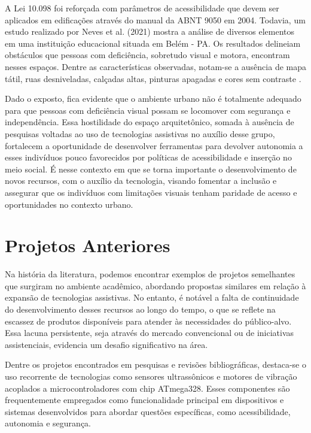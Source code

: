 A Lei 10.098 foi reforçada com parâmetros de acessibilidade que devem ser aplicados em edificações através do manual da ABNT 9050 em 2004. Todavia, um estudo realizado por Neves et al. (2021) mostra a análise de diversos elementos em uma instituição educacional situada em Belém - PA. Os resultados delineiam obstáculos que pessoas com deficiência, sobretudo visual e motora, encontram nesses espaços. Dentre as características observadas, notam-se a ausência de mapa tátil, ruas desniveladas, calçadas altas, pinturas apagadas e cores sem contraste \cite{BarreirasArquitetonicas}.  

Dado o exposto, fica evidente que o ambiente urbano não é totalmente adequado para que pessoas com deficiência visual possam se locomover com segurança e independência. Essa hostilidade do espaço arquitetônico, somada à ausência de pesquisas voltadas ao uso de tecnologias assistivas no auxílio desse grupo, fortalecem a oportunidade de desenvolver ferramentas para devolver autonomia a esses indivíduos pouco favorecidos por políticas de acessibilidade e inserção no meio social. É nesse contexto em que se torna importante o desenvolvimento de novos recursos, com o auxílio da tecnologia, visando fomentar a inclusão e assegurar que os indivíduos com limitações visuais tenham paridade de acesso e oportunidades no contexto urbano.

\section{Projetos Anteriores}
Na história da literatura, podemos encontrar exemplos de projetos semelhantes que surgiram no ambiente acadêmico, abordando propostas similares em relação à expansão de tecnologias assistivas. No entanto, é notável a falta de continuidade do desenvolvimento desses recursos ao longo do tempo, o que se reflete na escassez de produtos disponíveis para atender às necessidades do público-alvo. Essa lacuna persistente, seja através do mercado convencional ou de iniciativas assistenciais, evidencia um desafio significativo na área.

Dentre os projetos encontrados em pesquisas e revisões bibliográficas, destaca-se o uso recorrente de tecnologias como sensores ultrassônicos e motores de vibração acoplados a microcontroladores com chip ATmega328. Esses componentes são frequentemente empregados como funcionalidade principal em dispositivos e sistemas desenvolvidos para abordar questões específicas, como acessibilidade, autonomia e segurança.

